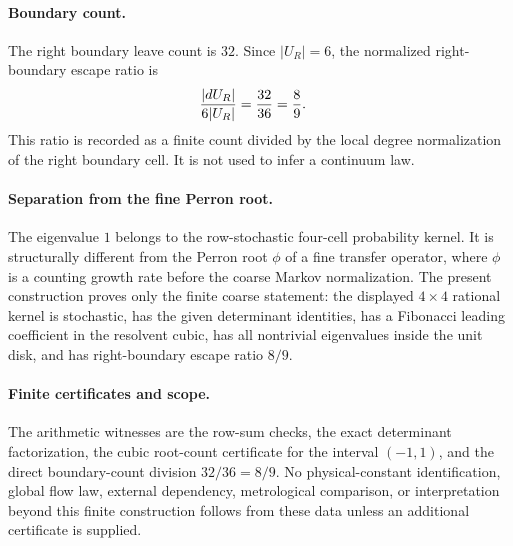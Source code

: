 \paragraph{Boundary count.}
The right boundary leave count is $32$.  Since $|U_R|=6$, the normalized right-boundary escape ratio is
$$
\begin{aligned}
{|dU_R|\over 6|U_R|}&={32\over 36}={8\over 9}.
\end{aligned}
$$
This ratio is recorded as a finite count divided by the local degree normalization of the right boundary cell.  It is not used to infer a continuum law.

\paragraph{Separation from the fine Perron root.}
The eigenvalue $1$ belongs to the row-stochastic four-cell probability kernel.  It is structurally different from the Perron root $\phi$ of a fine transfer operator, where $\phi$ is a counting growth rate before the coarse Markov normalization.  The present construction proves only the finite coarse statement: the displayed $4\times4$ rational kernel is stochastic, has the given determinant identities, has a Fibonacci leading coefficient in the resolvent cubic, has all nontrivial eigenvalues inside the unit disk, and has right-boundary escape ratio $8/9$.

\paragraph{Finite certificates and scope.}
The arithmetic witnesses are the row-sum checks, the exact determinant factorization, the cubic root-count certificate for the interval $(-1,1)$, and the direct boundary-count division $32/36=8/9$.  No physical-constant identification, global flow law, external dependency, metrological comparison, or interpretation beyond this finite construction follows from these data unless an additional certificate is supplied.
